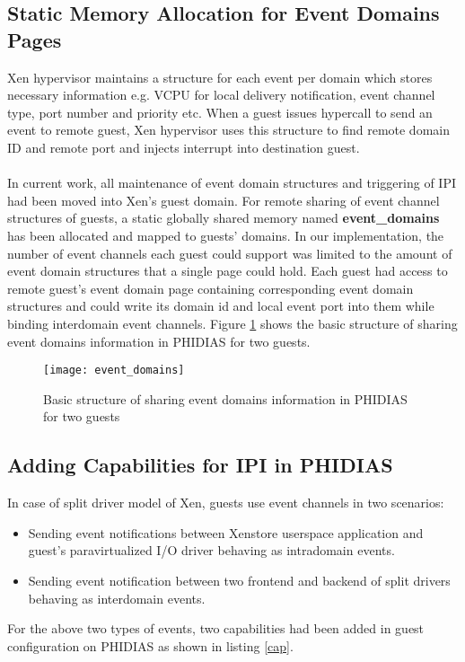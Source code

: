 \subsection{Static Memory Allocation for Event Domains Pages \label{sec:eventsdomains}}
Xen hypervisor maintains a structure for each event per domain which stores necessary information e.g. VCPU for local delivery notification, event channel type, port number and priority etc. When a guest issues hypercall to send an event to remote guest, Xen hypervisor uses this structure to find remote domain ID and remote port and injects interrupt into destination guest. 
\\
\\
In current work, all maintenance of event domain structures and triggering of IPI had been moved into Xen's guest domain. For remote sharing of event channel structures of guests, a static globally shared memory named \textbf{event\_domains} has been allocated and mapped to guests' domains. In our implementation, the number of event channels each guest could support was limited to the amount of event domain structures that a single page could hold. Each guest had access to remote guest's event domain page containing corresponding event domain structures and could write its domain id and local event port into them while binding interdomain event channels. Figure \ref{event_domains} shows the basic structure of sharing event domains information in PHIDIAS for two guests.

\begin{figure}[!htbp]
	\centering
	\texttt{[image: event\_domains]}
	\caption{Basic structure of sharing event domains information in PHIDIAS for two guests}
	\label{event_domains}
\end{figure}

\subsection{Adding Capabilities for IPI in PHIDIAS \label{sec:eventsdomains}}
In case of split driver model of Xen, guests use event channels in two scenarios:
\begin{itemize}
	\item Sending event notifications between Xenstore userspace application and guest's  paravirtualized I/O driver behaving as intradomain events.
	\item Sending event notification between two frontend and backend of split drivers behaving as interdomain events.
\end{itemize}
For the above two types of events, two capabilities had been added in guest configuration on PHIDIAS as shown in listing \ref{cap}.\\

